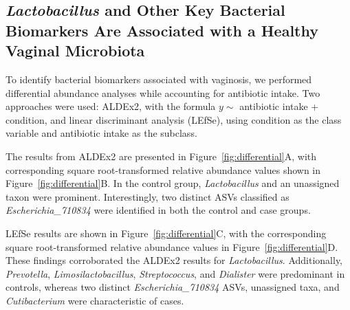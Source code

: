 \documentclass[biotech,article,submit,pdftex,moreauthors]{Definitions/mdpi}
\begin{document}
\subsection{\textit{Lactobacillus} and Other Key Bacterial Biomarkers Are Associated with a Healthy Vaginal Microbiota}

To identify bacterial biomarkers associated with vaginosis, we performed differential abundance analyses while accounting for antibiotic intake. Two approaches were used: ALDEx2, with the formula $y \sim$ antibiotic intake + condition, and linear discriminant analysis (LEfSe), using condition as the class variable and antibiotic intake as the subclass.

The results from ALDEx2 are presented in Figure~\ref{fig:differential}A, with corresponding square root-transformed relative abundance values shown in Figure~\ref{fig:differential}B. In the control group, \textit{Lactobacillus} and an unassigned taxon were prominent. Interestingly, two distinct ASVs classified as \textit{Escherichia\_710834} were identified in both the control and case groups.

LEfSe results are shown in Figure~\ref{fig:differential}C, with the corresponding square root-transformed relative abundance values in Figure~\ref{fig:differential}D. These findings corroborated the ALDEx2 results for \textit{Lactobacillus}. Additionally, \textit{Prevotella}, \textit{Limosilactobacillus}, \textit{Streptococcus}, and \textit{Dialister} were predominant in controls, whereas two distinct \textit{Escherichia\_710834} ASVs, unassigned taxa, and \textit{Cutibacterium} were characteristic of cases.
\end{document}
